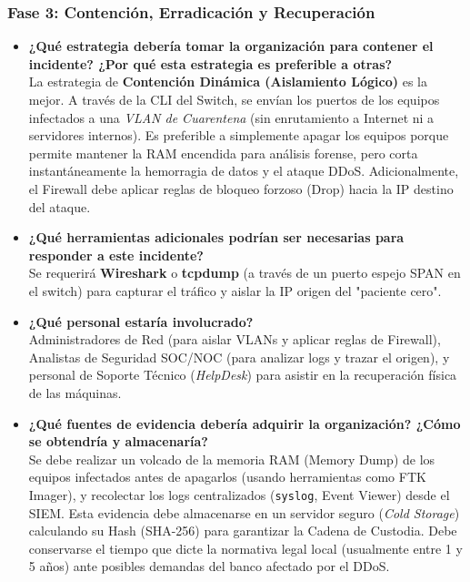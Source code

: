 \documentclass[12pt,a4paper]{article}
\begin{document}
\subsubsection{Fase 3: Contención, Erradicación y Recuperación}
\begin{itemize}
    \item \textbf{¿Qué estrategia debería tomar la organización para contener el incidente? ¿Por qué esta estrategia es preferible a otras?}\\
    La estrategia de \textbf{Contención Dinámica (Aislamiento Lógico)} es la mejor. A través de la CLI del Switch, se envían los puertos de los equipos infectados a una \textit{VLAN de Cuarentena} (sin enrutamiento a Internet ni a servidores internos). Es preferible a simplemente apagar los equipos porque permite mantener la RAM encendida para análisis forense, pero corta instantáneamente la hemorragia de datos y el ataque DDoS. Adicionalmente, el Firewall debe aplicar reglas de bloqueo forzoso (Drop) hacia la IP destino del ataque.
    \item \textbf{¿Qué herramientas adicionales podrían ser necesarias para responder a este incidente?}\\
    Se requerirá \textbf{Wireshark} o \textbf{tcpdump} (a través de un puerto espejo SPAN en el switch) para capturar el tráfico y aislar la IP origen del "paciente cero".
    \item \textbf{¿Qué personal estaría involucrado?}\\
    Administradores de Red (para aislar VLANs y aplicar reglas de Firewall), Analistas de Seguridad SOC/NOC (para analizar logs y trazar el origen), y personal de Soporte Técnico (\textit{HelpDesk}) para asistir en la recuperación física de las máquinas.
    \item \textbf{¿Qué fuentes de evidencia debería adquirir la organización? ¿Cómo se obtendría y almacenaría?}\\
    Se debe realizar un volcado de la memoria RAM (Memory Dump) de los equipos infectados antes de apagarlos (usando herramientas como FTK Imager), y recolectar los logs centralizados (\texttt{syslog}, Event Viewer) desde el SIEM. Esta evidencia debe almacenarse en un servidor seguro (\textit{Cold Storage}) calculando su Hash (SHA-256) para garantizar la Cadena de Custodia. Debe conservarse el tiempo que dicte la normativa legal local (usualmente entre 1 y 5 años) ante posibles demandas del banco afectado por el DDoS.
\end{itemize}
\end{document}
